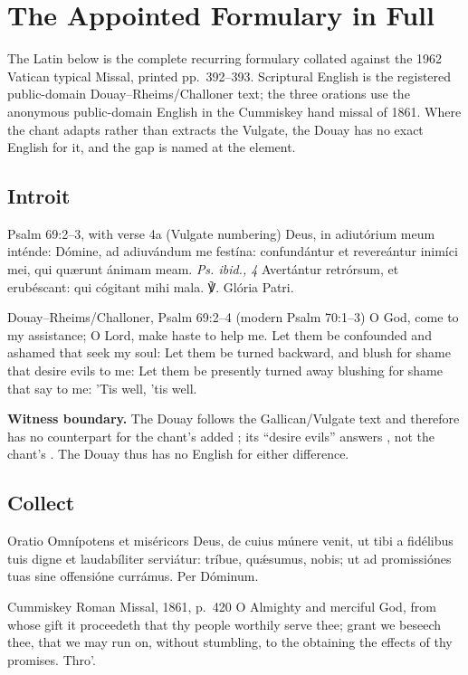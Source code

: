 \sectionguard
\section*{The Appointed Formulary in Full}

The Latin below is the complete recurring formulary collated against the 1962
Vatican typical Missal, printed pp.~392--393. Scriptural English is the
registered public-domain Douay--Rheims/Challoner text; the three orations use
the anonymous public-domain English in the Cummiskey hand missal of 1861.
Where the chant adapts rather than extracts the Vulgate, the Douay has no
exact English for it, and the gap is named at the element.

\elementguard
\subsection*{Introit }
\begin{appointedlatin}{Psalm 69:2--3, with verse 4a (Vulgate numbering)}
Deus, in adiutórium meum inténde: Dómine, ad adiuvándum me festína:
confundántur et revereántur inimíci mei, qui quærunt ánimam meam.
\emph{Ps. ibid., 4} Avertántur retrórsum, et erubéscant: qui cógitant mihi
mala. ℣. Glória Patri.
\end{appointedlatin}
\begin{namedtranslation}{Douay--Rheims/Challoner, Psalm 69:2--4 (modern Psalm 70:1--3)}
O God, come to my assistance; O Lord, make haste to help me. Let them be
confounded and ashamed that seek my soul: Let them be turned backward, and
blush for shame that desire evils to me: Let them be presently turned away
blushing for shame that say to me: 'Tis well, 'tis well.

\textbf{Witness boundary.} The Douay follows the Gallican/Vulgate text and
therefore has no counterpart for the chant's added ; its
``desire evils'' answers , not the chant's
. The Douay thus has no English for either
difference.
\end{namedtranslation}

\elementguard
\subsection*{Collect }
\begin{appointedlatin}{Oratio}
Omnípotens et miséricors Deus, de cuius múnere venit, ut tibi a fidélibus tuis
digne et laudabíliter serviátur: tríbue, quǽsumus, nobis; ut ad promissiónes
tuas sine offensióne currámus. Per Dóminum.
\end{appointedlatin}
\begin{namedtranslation}{Cummiskey Roman Missal, 1861, p.~420}
O Almighty and merciful God, from whose gift it proceedeth that thy people
worthily serve thee; grant we beseech thee, that we may run on, without
stumbling, to the obtaining the effects of thy promises. Thro'.
\end{namedtranslation}

